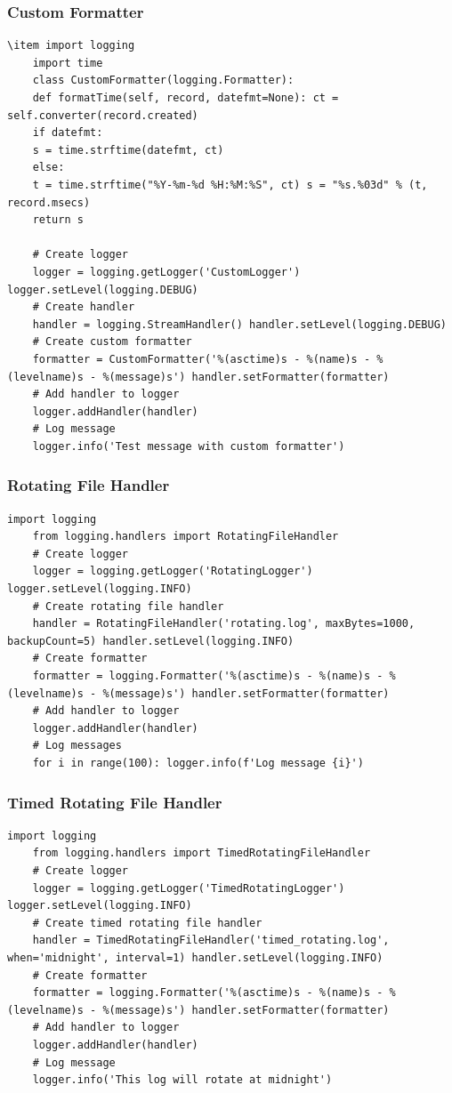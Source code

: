 \subsubsection{Custom Formatter}

\begin{lstlisting}[style=pythonstyle]
	\item import logging
	import time
	class CustomFormatter(logging.Formatter):
	def formatTime(self, record, datefmt=None): ct = self.converter(record.created)
	if datefmt:
	s = time.strftime(datefmt, ct)
	else:
	t = time.strftime("%Y-%m-%d %H:%M:%S", ct) s = "%s.%03d" % (t, record.msecs)
	return s
	
	# Create logger
	logger = logging.getLogger('CustomLogger') logger.setLevel(logging.DEBUG)
	# Create handler
	handler = logging.StreamHandler() handler.setLevel(logging.DEBUG)
	# Create custom formatter
	formatter = CustomFormatter('%(asctime)s - %(name)s - %(levelname)s - %(message)s') handler.setFormatter(formatter)
	# Add handler to logger
	logger.addHandler(handler)
	# Log message
	logger.info('Test message with custom formatter')
\end{lstlisting}

\subsubsection{Rotating File Handler}

\begin{lstlisting}[style=pythonstyle]
	import logging
	from logging.handlers import RotatingFileHandler
	# Create logger
	logger = logging.getLogger('RotatingLogger') logger.setLevel(logging.INFO)
	# Create rotating file handler
	handler = RotatingFileHandler('rotating.log', maxBytes=1000, backupCount=5) handler.setLevel(logging.INFO)
	# Create formatter
	formatter = logging.Formatter('%(asctime)s - %(name)s - %(levelname)s - %(message)s') handler.setFormatter(formatter)
	# Add handler to logger
	logger.addHandler(handler)
	# Log messages
	for i in range(100): logger.info(f'Log message {i}')
\end{lstlisting}

\subsubsection{Timed Rotating File Handler}

\begin{lstlisting}[style=pythonstyle]
	import logging
	from logging.handlers import TimedRotatingFileHandler
	# Create logger
	logger = logging.getLogger('TimedRotatingLogger') logger.setLevel(logging.INFO)
	# Create timed rotating file handler
	handler = TimedRotatingFileHandler('timed_rotating.log', when='midnight', interval=1) handler.setLevel(logging.INFO)
	# Create formatter
	formatter = logging.Formatter('%(asctime)s - %(name)s - %(levelname)s - %(message)s') handler.setFormatter(formatter)
	# Add handler to logger
	logger.addHandler(handler)
	# Log message
	logger.info('This log will rotate at midnight')
\end{lstlisting}

